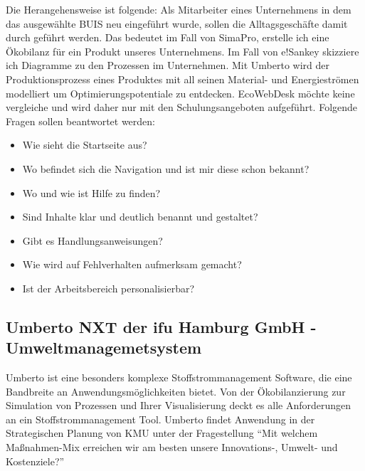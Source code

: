 \documentclass[a4paper, 12pt, twoside, BCOR=20mm, DIV=calc, abstracton, parskip=half*, toc=bibliography, toc=listof, headsepline, footsepline, headings=small, numbers=enddot]{scrreprt}
\begin{document}
Die Herangehensweise ist folgende: Als Mitarbeiter eines Unternehmens in dem das ausgewählte \ac{BUIS} neu eingeführt wurde, sollen die Alltagsgeschäfte damit durch geführt werden. Das bedeutet im Fall von SimaPro, erstelle ich eine Ökobilanz für ein Produkt unseres Unternehmens. Im Fall von e!Sankey skizziere ich Diagramme zu den Prozessen im Unternehmen. Mit Umberto wird der Produktionsprozess eines Produktes mit all seinen Material- und Energieströmen modelliert um Optimierungspotentiale zu entdecken. EcoWebDesk möchte keine vergleiche und wird daher nur mit den Schulungsangeboten aufgeführt.    
Folgende Fragen sollen beantwortet werden:
\begin{itemize}
\item Wie sieht die Startseite aus?
\item Wo befindet sich die Navigation und ist mir diese schon bekannt?
\item Wo und wie ist Hilfe zu finden?
\item Sind Inhalte klar und deutlich benannt und gestaltet?
\item Gibt es Handlungsanweisungen?
\item Wie wird auf Fehlverhalten aufmerksam gemacht?
\item Ist der Arbeitsbereich personalisierbar?
\end{itemize}
	
\subsection{Umberto NXT der ifu Hamburg GmbH - Umweltmanagemetsystem} 

	Umberto ist eine besonders komplexe Stoffstrommanagement Software, die eine Bandbreite an Anwendungsmöglichkeiten bietet. Von der Ökobilanzierung zur Simulation von Prozessen und Ihrer Visualisierung deckt es alle Anforderungen an ein Stoffstrommanagement Tool. %
	Umberto findet Anwendung in der Strategischen Planung von \ac{KMU} unter der Fragestellung "`Mit welchem Maßnahmen-Mix erreichen wir am besten unsere Innovations-, Umwelt- und Kostenziele?"'
\end{document}
